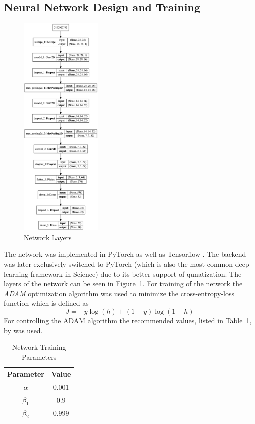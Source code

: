 \subsection{Neural Network Design and Training}
\label{subsec:nntraining}

\begin{figure}
	\centering
    \includegraphics[width=0.35\textwidth]{img/nnlayout}
	\caption{Network Layers}
	\label{fig:network-layers}
\end{figure}

The network was implemented in PyTorch \cite{Paszke:2019aa} as well as Tensorflow \cite{MartinAbadi:2015aa}. The backend was later exclusively switched to PyTorch (which is also the most common deep learning framework in Science) due to its better support of qunatization. The layers of the network can be seen in Figure~\ref{fig:network-layers}. 
For training of the network the \emph{ADAM} optimization algorithm \cite{Kingma:2014aa} was used to minimize the cross-entropy-loss function which is defined as
\begin{equation}
    J = - y  \log(h) + (1-y)  \log(1-h)
\end{equation}
For controlling the ADAM algorithm the recommended values, listed in Table~\ref{tab:train-params}, by \cite{Kingma:2014aa} was used.
\begin{table}[ht]
	\centering
    \caption{Network Training Parameters}
    \begin{tabular}{cc}
        \toprule
            Parameter & Value \\
        \midrule
            $\alpha$   & $0.001$ \\
            $\beta_1$  & $0.9$   \\
            $\beta_2$  & $0.999$  \\          
        \bottomrule
    \end{tabular}
    \label{tab:train-params}
\end{table}

